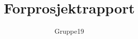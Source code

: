 \documentclass[11pt,a4paper,titlepage]{report}
\author{Gruppe19}
\title{Forprosjektrapport}
\begin{document}
\maketitle
\tableofcontents

\newcommand{\mw}{\emph{Making Waves}}
\newcommand{\es}{\emph{Elasticsearch}}
\newcommand{\rb}{\emph{Redd Barna}}
\newcommand{\cs}{C\nolinebreak\hspace{-.05em}\raisebox{.6ex}{\scriptsize\bf \#}}










%
%
	
\end{document}
